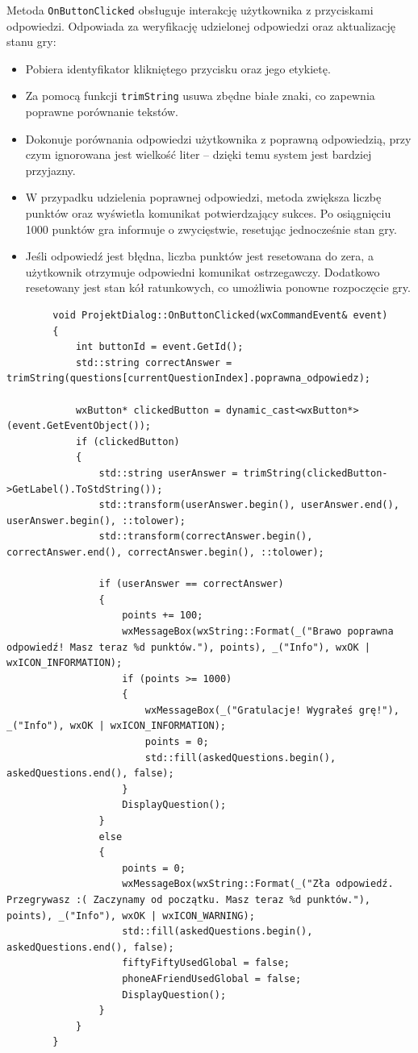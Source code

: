 \documentclass[]{article}
\begin{document}
Metoda \texttt{OnButtonClicked} obsługuje interakcję użytkownika z przyciskami odpowiedzi. Odpowiada za weryfikację udzielonej odpowiedzi oraz aktualizację stanu gry:
\begin{itemize}
	\item Pobiera identyfikator klikniętego przycisku oraz jego etykietę.
	\item Za pomocą funkcji \texttt{trimString} usuwa zbędne białe znaki, co zapewnia poprawne porównanie tekstów.
	\item Dokonuje porównania odpowiedzi użytkownika z poprawną odpowiedzią, przy czym ignorowana jest wielkość liter – dzięki temu system jest bardziej przyjazny.
	\item W przypadku udzielenia poprawnej odpowiedzi, metoda zwiększa liczbę punktów oraz wyświetla komunikat potwierdzający sukces. Po osiągnięciu 1000 punktów gra informuje o zwycięstwie, resetując jednocześnie stan gry.
	\item Jeśli odpowiedź jest błędna, liczba punktów jest resetowana do zera, a użytkownik otrzymuje odpowiedni komunikat ostrzegawczy. Dodatkowo resetowany jest stan kół ratunkowych, co umożliwia ponowne rozpoczęcie gry.
\end{itemize}

	\begin{verbatim}
		void ProjektDialog::OnButtonClicked(wxCommandEvent& event)
		{
			int buttonId = event.GetId();
			std::string correctAnswer = trimString(questions[currentQuestionIndex].poprawna_odpowiedz);
			
			wxButton* clickedButton = dynamic_cast<wxButton*>(event.GetEventObject());
			if (clickedButton)
			{
				std::string userAnswer = trimString(clickedButton->GetLabel().ToStdString());
				std::transform(userAnswer.begin(), userAnswer.end(), userAnswer.begin(), ::tolower);
				std::transform(correctAnswer.begin(), correctAnswer.end(), correctAnswer.begin(), ::tolower);
				
				if (userAnswer == correctAnswer)
				{
					points += 100;
					wxMessageBox(wxString::Format(_("Brawo poprawna odpowiedź! Masz teraz %d punktów."), points), _("Info"), wxOK | wxICON_INFORMATION);
					if (points >= 1000)
					{
						wxMessageBox(_("Gratulacje! Wygrałeś grę!"), _("Info"), wxOK | wxICON_INFORMATION);
						points = 0;
						std::fill(askedQuestions.begin(), askedQuestions.end(), false);
					}
					DisplayQuestion();
				}
				else
				{
					points = 0;
					wxMessageBox(wxString::Format(_("Zła odpowiedź. Przegrywasz :( Zaczynamy od początku. Masz teraz %d punktów."), points), _("Info"), wxOK | wxICON_WARNING);
					std::fill(askedQuestions.begin(), askedQuestions.end(), false);
					fiftyFiftyUsedGlobal = false;
					phoneAFriendUsedGlobal = false;
					DisplayQuestion();
				}
			}
		}
	\end{verbatim}
	
\end{document}
